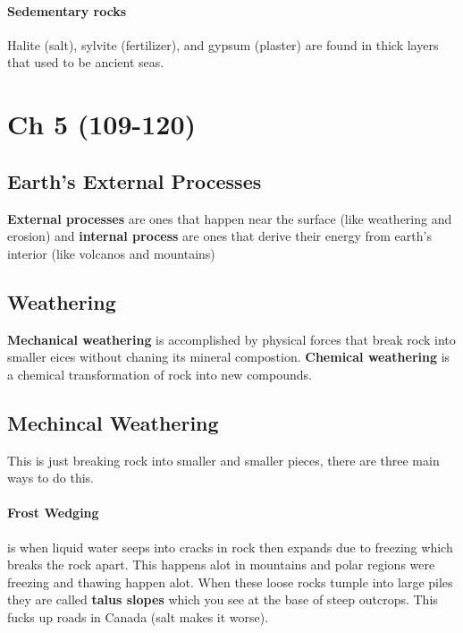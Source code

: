 \documentclass{article}
\begin{document}
\paragraph{Sedementary rocks} %
\label{par:sedementary_rocks}
Halite (salt), sylvite (fertilizer), and gypsum (plaster) are found in thick layers that used to be ancient seas.



\section{Ch 5 (109-120)} %
\label{sec:ch_5_}
\subsection{Earth's External Processes} %
\label{sub:earth_s_external_processes}
\textbf{External processes} are ones that happen near the surface (like weathering and erosion) and \textbf{internal process} are ones that derive their energy from earth's interior (like volcanos and mountains)

\subsection{Weathering} %
\label{sub:weathering}
\textbf{Mechanical weathering} is accomplished by physical forces that break rock into smaller eices without chaning its mineral compostion. \textbf{Chemical weathering} is a chemical transformation of rock into new compounds.

\subsection{Mechincal Weathering} %
\label{sub:mechincal_weathering}
This is just breaking rock into smaller and smaller pieces, there are three main ways to do this.

\paragraph{Frost Wedging} %
\label{par:frost_wedging}
is when liquid water seeps into cracks in rock then expands due to freezing which breaks the rock apart. This happens alot in mountains and polar regions were freezing and thawing happen alot. When these loose rocks tumple into large piles they are called \textbf{talus slopes} which you see at the base of steep outcrops. This fucks up roads in Canada (salt makes it worse).
\end{document}
